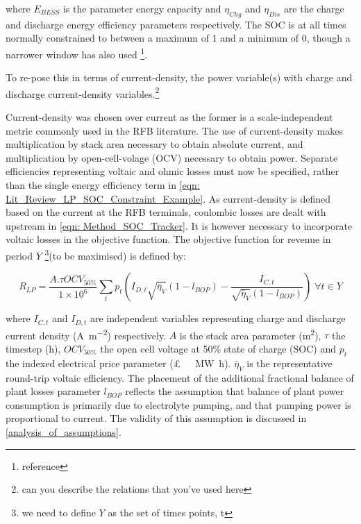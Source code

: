 \documentclass[preprint,3p,review,authoryear,10pt]{elsarticle}
\newcommand{\sol}[1]{\footnote{#1}\marginpar{\fbox{\thefootnote}}}
\begin{document}
where $E_{BESS}$ is the parameter energy capacity and $\eta_{Chg}$ and $\eta_{Dis}$ are the charge and discharge energy efficiency parameters respectively. The SOC is at all times normally constrained to between a maximum of 1 and a minimum of 0, though a narrower window has also used \sol{reference}.

To re-pose this in terms of current-density, the power variable(s) with charge and discharge current-density variables.\sol{can you describe the relations that you've used here}

Current-density was chosen over current as the former is a scale-independent metric commonly used in the RFB literature. The use of current-density makes multiplication by stack area necessary to obtain absolute current, and multiplication by open-cell-volage (OCV) necessary to obtain power. Separate efficiencies representing voltaic and ohmic losses must now be specified, rather than the single energy efficiency term in \cref{eqn: Lit_Review_LP_SOC_Constraint_Example}. As current-density is defined based on the current at the RFB terminals, coulombic losses are dealt with upstream in \cref{eqn: Method_SOC_Tracker}. It is however necessary to incorporate voltaic losses in the objective function.  The objective function for revenue in period $Y$ \sol{we need to define $Y$ as the set of times points, t}(to be maximised) is defined by:


\begin{equation}
\label{eqn: Linear_Schedule_Objective_Function_Current_as_Variable}
R_{LP} = \frac{A.\tau OCV_{50\%}}{1\times 10^{6}}\sum_{t}p_{t}(I_{D, t}\sqrt{\bar\eta_{V}}(1 - l_{BOP}) - \frac{I_{C,t}}{\sqrt{\bar\eta_{V}}(1 - l_{BOP})}) \; \forall t \in Y
\end{equation}

where $I_{C,t}$ and $I_{D,t}$ are independent variables representing charge and discharge current density (\si{\ampere\per\square\meter}) respectively. $A$ is the stack area parameter (\si{\square\meter}), $\tau$ the timestep (\si{\hour}), $OCV_{50\%}$ the open cell voltage at 50\% state of charge (SOC) and $p_t$ the indexed electrical price parameter (\SI[sticky-per, bracket-unit-denominator = false]{}[\pounds]{\per\mega\watt\hour}). $\bar\eta_{V}$ is the representative round-trip voltaic efficiency. The  placement of the additional fractional balance of plant losses parameter $l_{BOP}$ reflects the assumption that balance of plant power consumption is primarily due to electrolyte pumping, and that pumping power is proportional to current. The validity of this assumption is discussed in \cref{analysis_of_assumptions}. 
\end{document}
